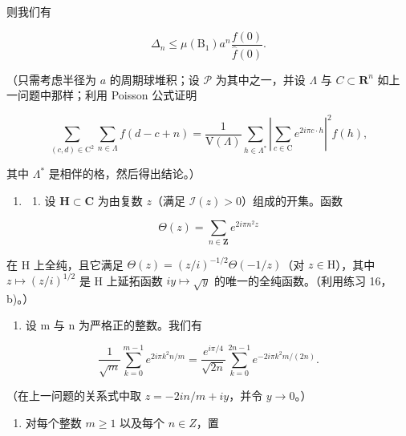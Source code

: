 则我们有

\[
\Delta_ {n} \leqslant \mu (\mathrm{B} _ {1}) a ^ {n} \frac {f (0)}{\widehat {f} (0)}.
\]

（只需考虑半径为 \(a\) 的周期球堆积；设 \(\mathcal{P}\) 为其中之一，并设 \(\Lambda\) 与 \(C \subset \mathbf{R}^n\) 如上一问题中那样；利用 Poisson 公式证明

\[
\sum_ {(c, d) \in \mathrm{C} ^ {2}} \sum_ {n \in \Lambda} f (d - c + n) = \frac {1}{\mathrm{V} (\Lambda)} \sum_ {h \in \Lambda^ {*}} \left| \sum_ {c \in \mathrm{C}} e ^ {2 i \pi c \cdot h} \right| ^ {2} \widehat {f} (h),
\]

其中 \(\Lambda^{*}\) 是相伴的格，然后得出结论。）

\begin{enumerate}
\def\labelenumi{\arabic{enumi})}
\setcounter{enumi}{59}
\tightlist
\item
  \begin{enumerate}
  \def\labelenumii{\alph{enumii})}
  \tightlist
  \item
    设 \(\mathbf{H} \subset \mathbf{C}\) 为由复数 \(z\)（满足 \(\mathcal{I}(z) > 0\)）组成的开集。函数
  \end{enumerate}
\end{enumerate}

\[
\Theta (z) = \sum_ {n \in \mathbf {Z}} e ^ {2 i \pi n ^ {2} z}
\]

在 H 上全纯，且它满足 \(\Theta(z) = (z/i)^{-1/2}\Theta(-1/z)\)（对 \(z\in\mathrm{H}\)），其中 \(z\mapsto(z/i)^{1/2}\) 是 H 上延拓函数 \(iy\mapsto\sqrt{y}\) 的唯一的全纯函数。（利用练习 16，b)。）

\begin{enumerate}
\def\labelenumi{\alph{enumi})}
\setcounter{enumi}{1}
\tightlist
\item
  设 m 与 n 为严格正的整数。我们有
\end{enumerate}

\[
\frac {1}{\sqrt {m}} \sum_ {k = 0} ^ {m - 1} e ^ {2 i \pi k ^ {2} n / m} = \frac {e ^ {i \pi / 4}}{\sqrt {2 n}} \sum_ {k = 0} ^ {2 n - 1} e ^ {- 2 i \pi k ^ {2} m / (2 n)}.
\]

（在上一问题的关系式中取 \(z = -2in / m + iy\)，并令 \(y \to 0\)。）

\begin{enumerate}
\def\labelenumi{\alph{enumi})}
\setcounter{enumi}{2}
\tightlist
\item
  对每个整数 \(m \geqslant 1\) 以及每个 \(n \in Z\)，置
\end{enumerate}


